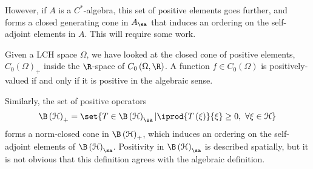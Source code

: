 \documentclass[10pt]{mypackage}
\begin{document}
However, if $A$ is a $C^{\ast}$-algebra, this set of positive elements goes further, and forms a closed generating cone in $A_{\sa}$ that induces an ordering on the self-adjoint elements in $A$. This will require some work.\newline

Given a LCH space $\Omega$, we have looked at the closed cone of positive elements, $C_0\left(\Omega\right)_{+}$ inside the $\R$-space of $C_0\left(\Omega,\R\right)$. A function $f\in C_0\left(\Omega\right)$ is positively-valued if and only if it is positive in the algebraic sense.\newline

Similarly, the set of positive operators
\begin{align*}
  \B\left(\mathcal{H}\right)_{+} = \set{T\in \B\left(\mathcal{H}\right)_{\sa} | \iprod{T\left(\xi\right)}{\xi} \geq 0,~\forall \xi\in \mathcal{H}}
\end{align*}
forms a norm-closed cone in $\B\left(\mathcal{H}\right)_{+}$, which induces an ordering on the self-adjoint elements of $\B\left(\mathcal{H}\right)_{\sa}$. Positivity in $\B\left(\mathcal{H}\right)_{\sa}$ is described spatially, but it is not obvious that this definition agrees with the algebraic definition.\newline
\end{document}
